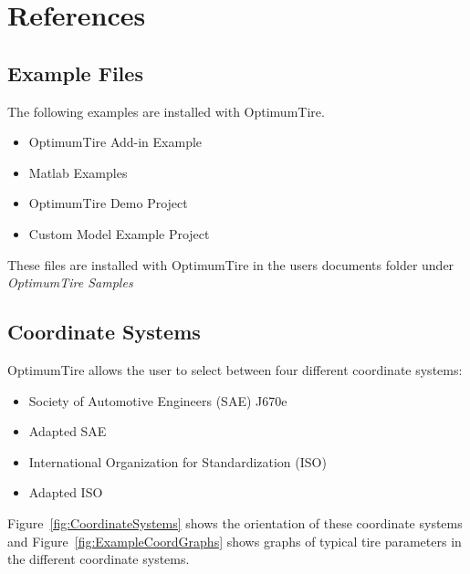 \chapter{References}
\setcounter{figure}{0}
\setcounter{table}{0}

\label{sec:References}

\section{Example Files}
\label{sec:ExampleFiles}
 The following examples are installed with OptimumTire.
 
 \begin{itemize}
\item	OptimumTire Add-in Example
\item	Matlab Examples
\item	OptimumTire Demo Project
\item	Custom Model Example Project
\end{itemize}

These files are installed with OptimumTire in the users documents folder under \textsl{OptimumTire Samples}

\section{Coordinate Systems}
\label{sec:CoordinateSystems}

OptimumTire allows the user to select between four different coordinate systems:

\begin{itemize}
\item	Society of Automotive Engineers (SAE) J670e
\item	Adapted SAE 
\item	International Organization for Standardization (ISO)
\item	Adapted ISO
\end{itemize}

Figure~\ref{fig:CoordinateSystems} shows the orientation of these coordinate systems and Figure~\ref{fig:ExampleCoordGraphs} shows graphs of typical tire parameters in the different coordinate systems.


